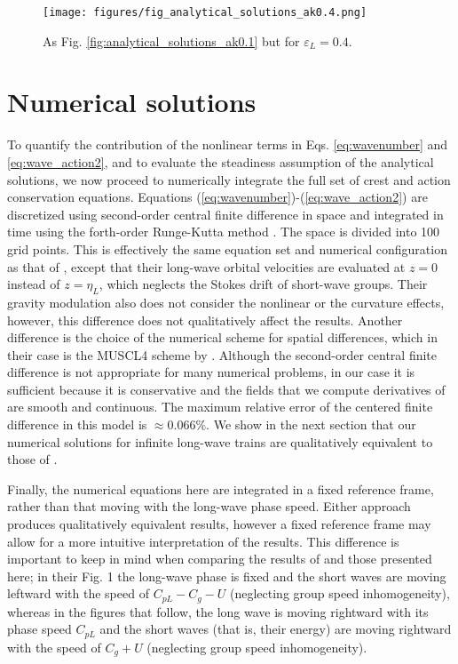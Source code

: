 \documentclass[lineno]{jfm}
\begin{document}
\begin{figure}
\centering
\texttt{[image: figures/fig\_analytical\_solutions\_ak0.4.png]}
\caption{As Fig. \ref{fig:analytical_solutions_ak0.1} but for $\varepsilon_L = 0.4$.}
\label{fig:analytical_solutions_ak0.4}
\end{figure}

\section{Numerical solutions}
\label{section:numerical_solutions}

To quantify the contribution of the nonlinear terms in Eqs. \ref{eq:wavenumber}
and \ref{eq:wave_action2}, and to evaluate the steadiness assumption of the
analytical solutions, we now proceed to numerically integrate the full set of
crest and action conservation equations.
Equations (\ref{eq:wavenumber})-(\ref{eq:wave_action2}) are discretized using
second-order central finite difference in space and integrated in time using the
forth-order Runge-Kutta method \citep{butcher1996runge}.
The space is divided into 100 grid points.
This is effectively the same equation set and numerical configuration as that of
\citet{peureux2021unsteady}, except that their long-wave orbital velocities are
evaluated at $z=0$ instead of $z=\eta_L$, which neglects the Stokes drift of
short-wave groups.
Their gravity modulation also does not consider the nonlinear or the curvature
effects, however, this difference does not qualitatively affect the results.
Another difference is the choice of the numerical scheme for spatial differences,
which in their case is the MUSCL4 scheme by \citet{kurganov2000new}.
Although the second-order central finite difference is not appropriate for many
numerical problems, in our case it is sufficient because it is conservative and
the fields that we compute derivatives of are smooth and continuous.
The maximum relative error of the centered finite difference in this model
is $\approx 0.066\%$.
We show in the next section that our numerical solutions for infinite long-wave
trains are qualitatively equivalent to those of \citet{peureux2021unsteady}.

Finally, the numerical equations here are integrated in a fixed reference frame,
rather than that moving with the long-wave phase speed.
Either approach produces qualitatively equivalent results, however a fixed
reference frame may allow for a more intuitive interpretation of the results.
This difference is important to keep in mind when comparing the results
of \citet{peureux2021unsteady} and those presented here; in their Fig. 1 the
long-wave phase is fixed and the short waves are moving leftward
with the speed of $C_{pL} - C_g - U$ (neglecting group speed inhomogeneity),
whereas in the figures that follow, the long wave is moving rightward with its
phase speed $C_{pL}$ and the short waves (that is, their energy) are moving
rightward with the speed of $C_g + U$ (neglecting group speed inhomogeneity).
\end{document}
